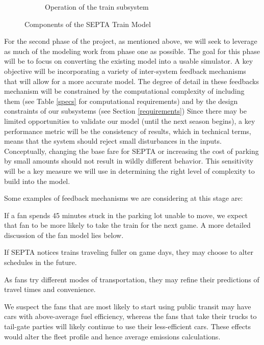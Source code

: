 \begin{figure}[htp]
\begin{subfigure}{.394\textwidth}
    \caption{Operation of the train subsystem}
    \label{septa}
  \end{subfigure}
  \caption{Components of the SEPTA Train Model}
\end{figure}

For the second phase of the project, as mentioned above, we will seek
to leverage as much of the modeling work from phase one as
possible. The goal for this phase will be to focus on converting the
existing model into a usable simulator. A key objective will be
incorporating a variety of inter-system feedback mechanisms that will
allow for a more accurate model.  The degree of detail in these
feedbacks mechanism will be constrained by the computational
complexity of including them (see Table \ref{specs} for computational
requirements) and by the design constraints of our subsystems (see
Section \ref{requirements}) Since there may be limited opportunities
to validate our model (until the next season begins), a key
performance metric will be the consistency of results, which in
technical terms, means that the system should reject small
disturbances in the inputs.  Conceptually, changing the base fare for
SEPTA or increasing the cost of parking by small amounts should not
result in wildly different behavior. This sensitivity will be a key
measure we will use in determining the right level of complexity to
build into the model.

Some examples of feedback mechanisms we are considering at this stage
are:

\begin{description}[style=nextline]
    \item[Congestion] If a fan spends 45 minutes stuck in the parking
  lot unable to move, we expect that fan to be more likely to take the
  train for the next game. A more detailed discussion of the fan model
  lies below.
    \item[Scheduling] If SEPTA notices trains traveling fuller on game
  days, they may choose to alter schedules in the future.
    \item[Uncertainty Effects] As fans try different modes of
  transportation, they may refine their predictions of travel times
  and convenience.
    \item[Fleet Composition] We suspect the fans that are most likely
  to start using public transit may have cars with above-average fuel
  efficiency, whereas the fans that take their trucks to tail-gate
  parties will likely continue to use their less-efficient cars.
  These effects would alter the fleet profile and hence average
  emissions calculations.
\end{description}

